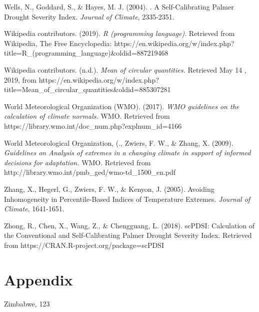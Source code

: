 \documentclass[
  letterpaper,
  DIV=11,
  numbers=noendperiod]{scrreprt}
\begin{document}
Wells, N., Goddard, S., \& Hayes, M. J. (2004). . A Self-Calibrating
Palmer Drought Severity Index. \emph{Journal of Climate}, 2335-2351.

Wikipedia contributors. (2019). \emph{R (programming language)}.
Retrieved from Wikipedia, The Free Encyclopedia:
https://en.wikipedia.org/w/index.php?title=R\_(programming\_language)\&oldid=887219468

Wikipedia contributors. (n.d.). \emph{Mean of circular quantities.}
Retrieved May 14 , 2019, from
https://en.wikipedia.org/w/index.php?title=Mean\_of\_circular\_quantities\&oldid=885307281

World Meteorological Organization (WMO). (2017). \emph{WMO guidelines on
the calculation of climate normals.} WMO. Retrieved from
https://library.wmo.int/doc\_num.php?explnum\_id=4166

World Meteorological Organization, (., Zwiers, F. W., \& Zhang, X.
(2009). \emph{Guidelines on Analysis of extremes in a changing climate
in support of informed decisions for adaptation.} WMO. Retrieved from
http://library.wmo.int/pmb\_ged/wmo-td\_1500\_en.pdf

Zhang, X., Hegerl, G., Zwiers, F. W., \& Kenyon, J. (2005). Avoiding
Inhomogeneity in Percentile-Based Indices of Temperature Extremes.
\emph{Journal of Climate}, 1641-1651.

Zhong, R., Chen, X., Wang, Z., \& Chengguang, L. (2018). scPDSI:
Calculation of the Conventional and Self-Calibrating Palmer Drought
Severity Index. Retrieved from https://CRAN.R-project.org/package=scPDSI


\chapter{Appendix}\label{appendix}

Zimbabwe, 123
\end{document}
